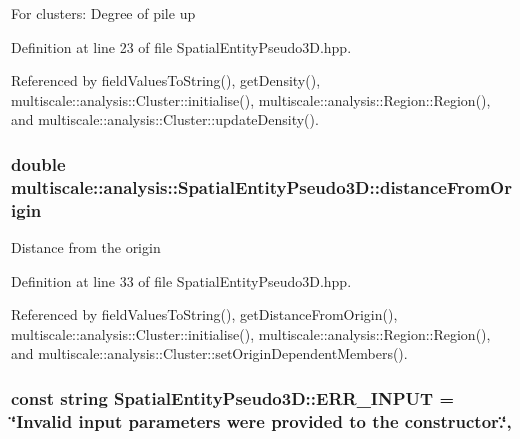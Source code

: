 For clusters\-: Degree of pile up 

Definition at line 23 of file Spatial\-Entity\-Pseudo3\-D.\-hpp.



Referenced by field\-Values\-To\-String(), get\-Density(), multiscale\-::analysis\-::\-Cluster\-::initialise(), multiscale\-::analysis\-::\-Region\-::\-Region(), and multiscale\-::analysis\-::\-Cluster\-::update\-Density().

\hypertarget{classmultiscale_1_1analysis_1_1SpatialEntityPseudo3D_a056f67b90ed41c0e6dc4df31b71ad906}{
\subsubsection[{distance\-From\-Origin}]{\setlength{\rightskip}{0pt plus 5cm}double multiscale\-::analysis\-::\-Spatial\-Entity\-Pseudo3\-D\-::distance\-From\-Origin\hspace{0.3cm}{\ttfamily [protected]}}}\label{classmultiscale_1_1analysis_1_1SpatialEntityPseudo3D_a056f67b90ed41c0e6dc4df31b71ad906}
Distance from the origin 

Definition at line 33 of file Spatial\-Entity\-Pseudo3\-D.\-hpp.



Referenced by field\-Values\-To\-String(), get\-Distance\-From\-Origin(), multiscale\-::analysis\-::\-Cluster\-::initialise(), multiscale\-::analysis\-::\-Region\-::\-Region(), and multiscale\-::analysis\-::\-Cluster\-::set\-Origin\-Dependent\-Members().

\hypertarget{classmultiscale_1_1analysis_1_1SpatialEntityPseudo3D_a5882e2e18343ccee821f1bd6b9c23724}{
\subsubsection[{E\-R\-R\-\_\-\-I\-N\-P\-U\-T}]{\setlength{\rightskip}{0pt plus 5cm}const string Spatial\-Entity\-Pseudo3\-D\-::\-E\-R\-R\-\_\-\-I\-N\-P\-U\-T = \char`\"{}Invalid input parameters were provided to the constructor.\char`\"{}\hspace{0.3cm}{\ttfamily [static]}, {\ttfamily [protected]}}}\label{classmultiscale_1_1analysis_1_1SpatialEntityPseudo3D_a5882e2e18343ccee821f1bd6b9c23724}


